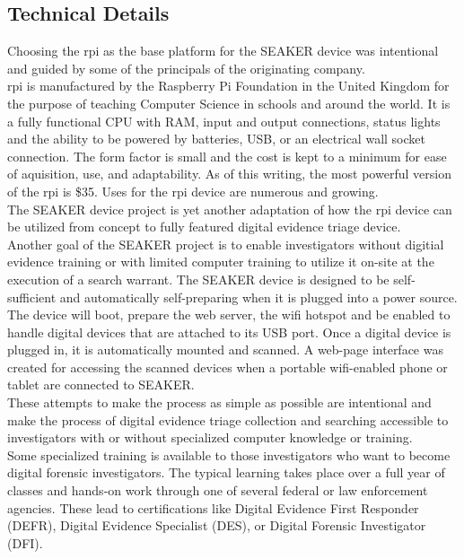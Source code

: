 \documentclass[12pt]{article}
\begin{document}
\subsection{Technical Details}

Choosing the \gls{rpi} as the base platform for the SEAKER device was intentional
and guided by some of the principals of the originating company.\\

\gls{rpi} is manufactured by the Raspberry Pi Foundation in the United Kingdom
for the purpose of teaching Computer Science in schools and around the world.  It
is a fully functional CPU with RAM, input and output connections, status lights
and the ability
to be powered by batteries, USB, or an electrical wall socket connection.
The form factor is small and the cost is kept to a minimum for ease of
aquisition, use, and adaptability.  As of this writing,
the most powerful version of the \gls{rpi} is \$35.  Uses for the \gls{rpi}
device are numerous and growing.\\

The SEAKER device project is yet another adaptation of how the \gls{rpi} device
can be utilized from concept to fully featured digital evidence triage device.\\

Another goal of the SEAKER project is to enable investigators without 
digitial evidence training or with limited computer training to utilize it
on-site at the execution of a search warrant.  The SEAKER device is designed to
be self-sufficient and automatically self-preparing when it is plugged into a 
power source.  The device will boot, prepare the web server, the wifi hotspot
and be enabled to handle digital devices that are attached to its USB port.
Once a digital device is plugged in, it is automatically mounted and scanned.
A web-page interface was created for accessing the scanned devices when a portable
wifi-enabled phone or tablet are connected to SEAKER.\\

These attempts to make the process as simple as possible are intentional and 
make the process of digital evidence triage collection and searching accessible
to investigators with or without specialized computer knowledge or training.\\

Some specialized training is available to those investigators who want to 
become digital forensic investigators.  The typical learning takes place over
a full year of classes and hands-on work through one of several federal or 
law enforcement agencies.  These lead to certifications like Digital Evidence
First Responder (DEFR), Digital Evidence Specialist (DES), or Digital Forensic
Investigator (DFI).\\
\end{document}
